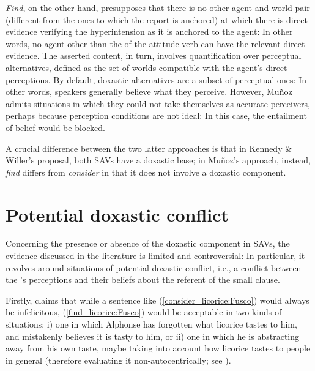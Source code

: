 \documentclass[output=paper,colorlinks,citecolor=brown]{langscibook}
\begin{document}
\textit{Find}, on the other hand, presupposes that there is no other agent and world pair (different from the ones to which the report is anchored) at which there is direct evidence verifying the hyperintension as it is anchored to the agent: In other words, no agent other than the  of the attitude verb can have the relevant direct evidence. The asserted content, in turn, involves quantification over perceptual alternatives, defined as the set of worlds compatible with the agent’s direct perceptions. By default, doxastic alternatives are a subset of perceptual ones: In other words, speakers generally believe what they perceive. However, Muñoz admits situations in which they could not take themselves as accurate perceivers, perhaps because perception conditions are not ideal: In this case, the entailment of belief would be blocked.

A crucial difference between the two latter approaches is that in Kennedy \& Willer's proposal, both SAVs have a doxastic base; in Muñoz's approach, instead, \textit{find} differs from \textit{consider} in that it does not involve a doxastic component.

\section{Potential doxastic conflict}
\label{sec:pdc:Fusco}

Concerning the presence or absence of the doxastic component in SAVs, the evidence discussed in the literature is limited and controversial: In particular, it revolves around situations of potential doxastic conflict, i.e., a conflict between the 's perceptions and their beliefs about the referent of the small clause.





Firstly, \citet{munoz2019} claims that while a sentence like (\ref{consider_licorice:Fusco}) would always be infelicitous, (\ref{find_licorice:Fusco}) would be acceptable in two kinds of situations: i) one in which Alphonse has forgotten what licorice tastes to him, and mistakenly believes it is tasty to him, or ii) one in which he is abstracting away from his own taste, maybe taking into account how licorice tastes to people in general (therefore evaluating it non-autocentrically; see \cite{lasersohn_2005,stephenson_judge_2007}).
\end{document}
